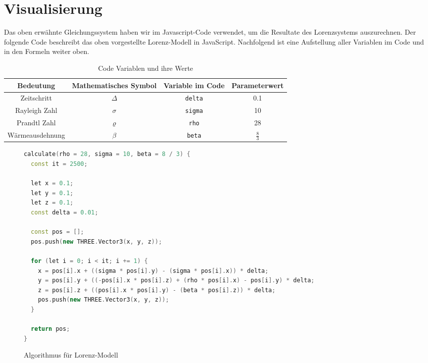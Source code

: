 
\section{Visualisierung}\label{visualisierung}
Das oben erwähnte Gleichungssystem haben wir im Javascript-Code verwendet, um die Resultate des Lorenzsystems auszurechnen. Der folgende Code beschreibt das oben vorgestellte Lorenz-Modell in JavaScript. Nachfolgend ist eine Aufstellung aller Variablen im Code und in den Formeln weiter oben.
%


	\begin{table}[]
		\centering
		\begin{tabular}{| c | c | c | c |}
			\hline
			\textbf{Bedeutung} & \textbf{Mathematisches Symbol} & \textbf{Variable im Code} & \textbf{Parameterwert}\\\hline
			Zeitschritt & $ \Delta $ & \texttt{delta} & 0.1 \\\hline
			Rayleigh Zahl & $ \sigma $ & \texttt{sigma} & 10 \\\hline
			Prandtl Zahl & $\varrho $ & \texttt{rho} & 28 \\\hline
			Wärmeausdehnung & $\beta $ & \texttt{beta}  & $ \frac{8}{3} $ \\\hline
		\end{tabular}
		\caption{Code Variablen und ihre Werte\label{CodeVariablen}}
	\end{table}

\begin{figure}
	\begin{lstlisting}[style=C, language=C++]
calculate(rho = 28, sigma = 10, beta = 8 / 3) {
  const it = 2500;

  let x = 0.1;
  let y = 0.1;
  let z = 0.1;
  const delta = 0.01;

  const pos = [];
  pos.push(new THREE.Vector3(x, y, z));

  for (let i = 0; i < it; i += 1) {
	x = pos[i].x + ((sigma * pos[i].y) - (sigma * pos[i].x)) * delta;
	y = pos[i].y + ((-pos[i].x * pos[i].z) + (rho * pos[i].x) - pos[i].y) * delta;
	z = pos[i].z + ((pos[i].x * pos[i].y) - (beta * pos[i].z)) * delta;
	pos.push(new THREE.Vector3(x, y, z));
  }

  return pos;
}
		\end{lstlisting}
		\caption{Algorithmus für Lorenz-Modell\label{AlgorithmusLorenz}}
\end{figure}

